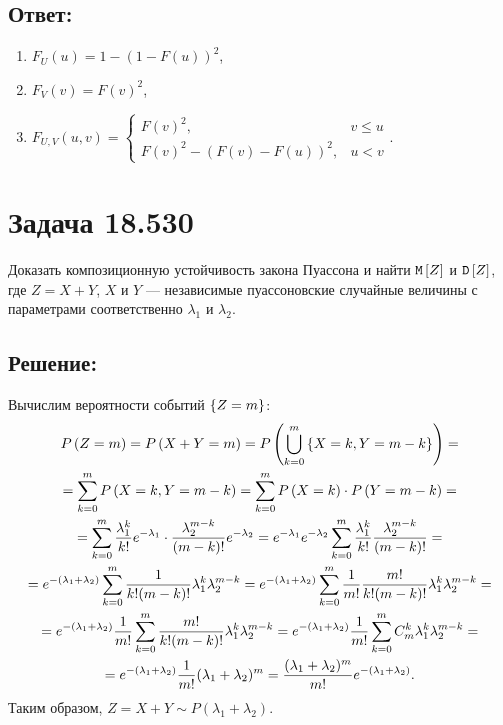 \subsection*{Ответ:}
\begin{enumerate}
    \item $F_U(u) = 1 - \left ( 1 - F(u) \right )^2$,
    \item $F_V(v) = F(v)^2$,
    \item $F_{U,V}(u,v)
    = \left \{
    \begin{array}{ll}
        F(v)^2,                                  & v \le u \\
        F(v)^2 - \left ( F(v) - F(u) \right )^2, & u < v
    \end{array}
    \right .
    .
    $
\end{enumerate}

\section*{Задача 18.530}

Доказать композиционную устойчивость закона Пуассона и найти $\mathtt{M} \left [ Z \right ]$ и $\mathtt{D} \left [ Z \right ]$, где $Z = X + Y$, $X$ и $Y$ --- независимые пуассоновские случайные величины с
параметрами соответственно $\lambda_1$ и $\lambda_2$.

\subsection*{Решение:}

Вычислим вероятности событий $\left \{ Z = m \right \}$:
\begin{multline}
    P \left ( Z = m \right )
    = P \left ( X + Y = m \right )
    = P \left ( \bigcup_{k=0}^m \left \{ X = k, Y = m - k \right \} \right ) = \\
    = \sum_{k=0}^m P \left ( X = k, Y = m - k \right )
    = \sum_{k=0}^m P \left ( X = k \right ) \cdot P \left ( Y = m - k \right ) = \\
    = \sum_{k=0}^m \frac{\lambda_1^k}{k!} e^{-\lambda_1} \cdot \frac{\lambda_2^{m-k}}{(m-k)!} e^{-\lambda_2}
    = e^{-\lambda_1} e^{-\lambda_2} \sum_{k=0}^m \frac{\lambda_1^k}{k!} \frac{\lambda_2^{m-k}}{(m-k)!} = \\
    = e^{-(\lambda_1+\lambda_2)} \sum_{k=0}^m \frac{1}{k!(m-k)!} \lambda_1^k \lambda_2^{m-k}
    = e^{-(\lambda_1+\lambda_2)} \sum_{k=0}^m \frac{1}{m!} \frac{m!}{k!(m-k)!} \lambda_1^k \lambda_2^{m-k} = \\
    = e^{-(\lambda_1+\lambda_2)} \frac{1}{m!} \sum_{k=0}^m \frac{m!}{k!(m-k)!} \lambda_1^k \lambda_2^{m-k}
    = e^{-(\lambda_1+\lambda_2)} \frac{1}{m!} \sum_{k=0}^m C_m^k \lambda_1^k \lambda_2^{m-k} = \\
    = e^{-(\lambda_1+\lambda_2)} \frac{1}{m!} (\lambda_1 + \lambda_2)^m
    = \frac{(\lambda_1 + \lambda_2)^m}{m!} e^{-(\lambda_1+\lambda_2)}.
\end{multline}
Таким образом, $Z = X + Y \sim P( \lambda_1 + \lambda_2 )$.

